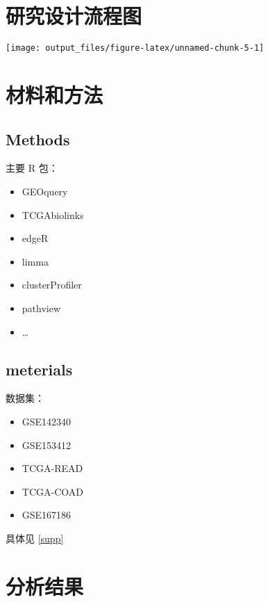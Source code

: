 \documentclass[
]{article}
\providecommand{\tightlist}{%
  \setlength{\itemsep}{0pt}\setlength{\parskip}{0pt}}
\begin{document}
\hypertarget{route}{%
\section{研究设计流程图}\label{route}}

\texttt{[image: output\_files/figure-latex/unnamed-chunk-5-1]}

\hypertarget{methods}{%
\section{材料和方法}\label{methods}}

\hypertarget{methods-1}{%
\subsection{Methods}\label{methods-1}}

主要 R 包：

\begin{itemize}
\tightlist
\item
  GEOquery
\item
  TCGAbiolinks
\item
  edgeR
\item
  limma
\item
  clusterProfiler
\item
  pathview
\item
  \ldots{}
\end{itemize}

\hypertarget{meterials}{%
\subsection{meterials}\label{meterials}}

数据集：

\begin{itemize}
\tightlist
\item
  GSE142340
\item
  GSE153412
\item
  TCGA-READ
\item
  TCGA-COAD
\item
  GSE167186
\end{itemize}

具体见 \ref{supp}

\hypertarget{results}{%
\section{分析结果}\label{results}}
\end{document}
